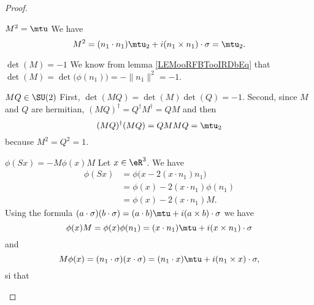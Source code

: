 \begin{proof}
\begin{subproof}
            \begin{subproof}
                \item[\( M^2=\mtu\)]
                    We have
                    \begin{equation}
                        M^2=(n_1\cdot n_1)\mtu_2+i(n_1\times n_1)\cdot \sigma=\mtu_2.
                    \end{equation}
                \item[\( \det(M)=-1\)]
                    We know from lemma \ref{LEMooRFBTooIRDbEq} that \( \det(M)=\det\big( \phi(n_1) \big)=-\| n_1 \|^2=-1\).
                \item[\( MQ\in \SU(2)\)]
                    First, \( \det(MQ)=\det(M)\det(Q)=-1\). Second, since \( M\) and \( Q\) are hermitian, \( (MQ)^{\dag}=Q^{\dag}M^{\dag}=QM\) and then
                    \begin{equation}
                        (MQ)^{\dag}(MQ)=QMMQ=\mtu_2
                    \end{equation}
                    because \( M^2=Q^2=1\).
                \item[\( \phi(Sx)=-M\phi(x)M\)]
                    Let \( x\in \eR^3\). We have
                    \begin{subequations}        \label{EQooSHKEooAhOxfH}
                        \begin{align}
                        \phi(Sx)&=\phi\big( x-2(x\cdot n_1)n_1 \big)\\
                        &=\phi(x)-2(x\cdot n_1)\phi(n_1)\\
                        &=\phi(x)-2(x\cdot n_1)M.
                        \end{align}
                    \end{subequations}
                    Using the formula \( (a\cdot \sigma)(b\cdot \sigma)=(a\cdot b)\mtu+i(a\times b)\cdot \sigma\) we have
                    \begin{equation}
                        \phi(x)M=\phi(x)\phi(n_1)=(x\cdot n_1)\mtu+i(x\times n_1)\cdot \sigma
                    \end{equation}
                    and
                    \begin{equation}
                        M\phi(x)=(n_1\cdot \sigma)(x\cdot \sigma)=(n_1\cdot x)\mtu+i(n_1\times x)\cdot \sigma,
                    \end{equation}
                    si that
                    \begin{equation}

\end{equation}
\end{subproof}
\end{subproof}
\end{proof}
